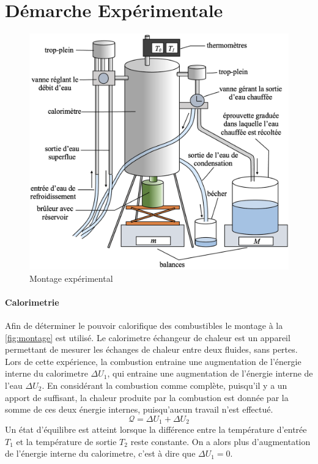 \section{Démarche Expérimentale}

\begin{figure}
    \centering
    \includegraphics[width=\linewidth]{figures/montage.png}
    \caption{Montage expérimental \cite{rapport-mendels-pascaud}}
    \label{fig:montage}
\end{figure}

\paragraph*{Calorimetrie}
Afin de déterminer le pouvoir calorifique des combustibles le montage à la \autoref{fig:montage} est utilisé. Le calorimetre échangeur de chaleur est un appareil permettant de mesurer les échanges de chaleur entre deux fluides, sans pertes. Lors de cette expérience, la combustion entraine une augmentation de l'énergie interne du calorimetre \(\Delta U_1\), qui entraine une augmentation de l'énergie interne de l'eau \(\Delta U_2\). En considérant la combustion comme complète, puisqu'il y a un apport de  suffisant, la chaleur produite par la combustion est donnée par la somme de ces deux énergie internes, puisqu'aucun travail n'est effectué.
\begin{equation}
    \mathcal{Q} = \Delta U_1 + \Delta U_2
\end{equation}
Un état d'équilibre est atteint lorsque la différence entre la température d'entrée \(T_1\) et la température de sortie \(T_2\) reste constante. On a alors plus d'augmentation de l'énergie interne du calorimetre, c'est à dire que \(\Delta U_1 = 0\).

